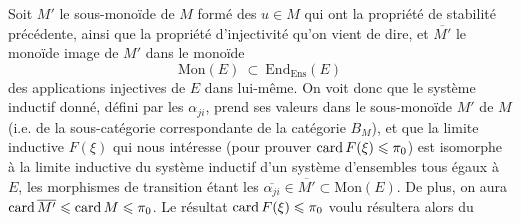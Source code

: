 Soit $M'$ le sous-monoïde de $M$ formé des $u \in M$ qui ont la propriété de stabilité précédente, ainsi que la propriété d'injectivité qu'on vient de dire, et $\overline{M'}$ le monoïde image de $M'$ dans le monoïde
\[
\mathrm{Mon}(E) \ \subset \ \mathrm{End}_{\mathrm{Ens}}(E)
\]
des applications injectives de $E$ dans lui-même. On voit donc que le système inductif donné, défini par les $\alpha_{ji}$, prend ses valeurs dans le sous-monoïde $M'$ de $M$ (i.e. de la sous-catégorie correspondante de la catégorie $B_M$), et que la limite inductive $F(\xi)$ qui nous intéresse (pour prouver $\operatorname{card} F(\xi) \leqslant \pi_0$) est isomorphe à la limite inductive du système inductif d'un système d'ensembles tous égaux à $E$, les morphismes de transition étant les $\overline{\alpha_{ji}} \in \overline{M'} \subset \mathrm{Mon}(E)$. De plus, on aura $\operatorname{card} \overline{M'} \leqslant \operatorname{card} M \leqslant \pi_0$. Le résultat $\operatorname{card} F(\xi) \leqslant \pi_0$ voulu résultera alors du


